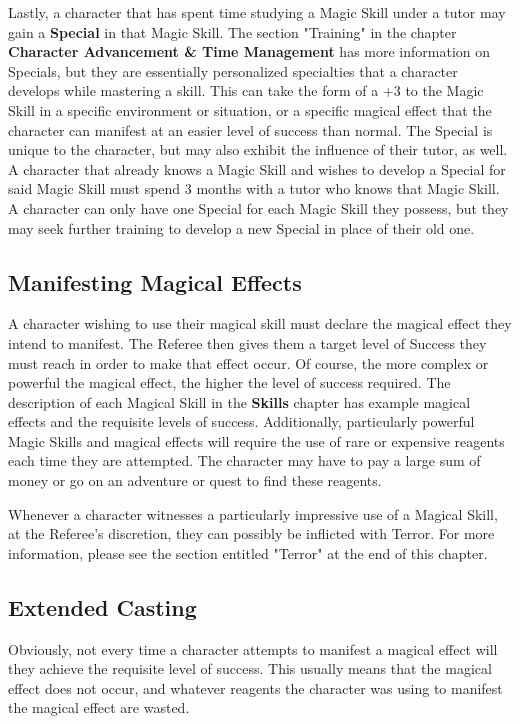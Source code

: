 \documentclass[oneside]{book}
\begin{document}
\begin{multicols}{2}
Lastly, a character that has spent time studying a Magic Skill under a tutor may gain a \textbf{Special} in that Magic Skill. The section "Training" in the chapter \textbf{Character Advancement \& Time Management} has more information on Specials, but they are essentially personalized specialties that a character develops while mastering a skill. This can take the form of a +3 to the Magic Skill in a specific environment or situation, or a specific magical effect that the character can manifest at an easier level of success than normal. The Special is unique to the character, but may also exhibit the influence of their tutor, as well. A character that already knows a Magic Skill and wishes to develop a Special for said Magic Skill must spend 3 months with a tutor who knows that Magic Skill. A character can only have one Special for each Magic Skill they possess, but they may seek further training to develop a new Special in place of their old one.

\subsection{Manifesting Magical Effects}
A character wishing to use their magical skill must declare the magical effect they intend to manifest. The Referee then gives them a target level of Success they must reach in order to make that effect occur. Of course, the more complex or powerful the magical effect, the higher the level of success required. The description of each Magical Skill in the \textbf{Skills} chapter has example magical effects and the requisite levels of success. Additionally, particularly powerful Magic Skills and magical effects will require the use of rare or expensive reagents each time they are attempted. The character may have to pay a large sum of money or go on an adventure or quest to find these reagents.

Whenever a character witnesses a particularly impressive use of a Magical Skill, at the Referee's discretion, they can possibly be inflicted with Terror. For more information, please see the section entitled "Terror" at the end of this chapter.  

\subsection{Extended Casting}
Obviously, not every time a character attempts to manifest a magical effect will they achieve the requisite level of success. This usually means that the magical effect does not occur, and whatever reagents the character was using to manifest the magical effect are wasted. 


\end{multicols}
\end{document}
